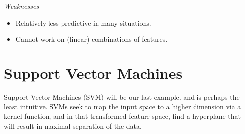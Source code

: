 \documentclass[english,nohyper,titlepage]{tufte-handout}\usepackage{knitr}
\begin{document}
\noindent\emph{Weaknesses}
\begin{itemize}
  \item Relatively less predictive in many situations.
  \item Cannot work on (linear) combinations of features.
\end{itemize}


\section{Support Vector Machines}

Support Vector Machines (SVM) will be our last example, and is perhaps the least intuitive.  SVMs seek to map the input space to a higher dimension via a kernel function, and in that transformed feature space, find a hyperplane that will result in maximal separation of the data.   
\end{document}
